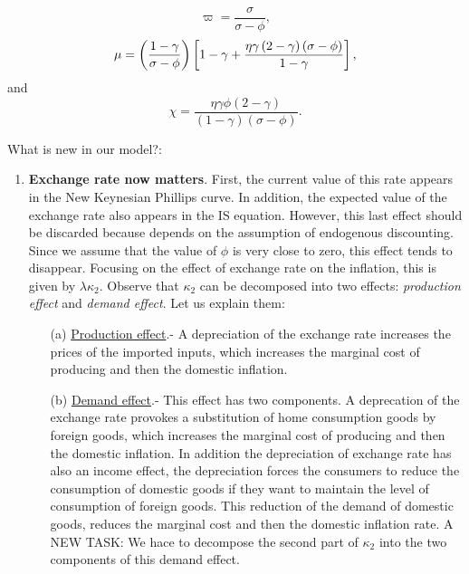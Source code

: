 \documentclass{article}
\begin{document}
\begin{equation*}
\varpi =\frac{\sigma }{\sigma -\phi },
\end{equation*}%
\begin{equation*}
\mu =\left( \frac{1-\gamma }{\sigma -\phi }\right) \left[ 1-\gamma +\frac{%
\eta \gamma \left( 2-\gamma \right) \left( \sigma -\phi \right) }{1-\gamma }%
\right] ,
\end{equation*}%
and%
\begin{equation*}
\chi =\frac{\eta \gamma \phi \left( 2-\gamma \right) }{\left( 1-\gamma
\right) \left( \sigma -\phi \right) }.
\end{equation*}

What is new in our model?:

\begin{enumerate}
\item \textbf{Exchange rate now matters}. First, the current value of this
rate appears in the New Keynesian Phillips curve. In addition, the expected
value of the exchange rate also appears in the IS equation. However, this
last effect should be discarded because depends on the assumption of
endogenous discounting. Since we assume that the value of $\phi $ is very
close to zero, this effect tends to disappear. Focusing on the effect of
exchange rate on the inflation, this is given by $\lambda \kappa _{2}.$
Observe that $\kappa _{2}$ can be decomposed into two effects: \textit{%
production effect} and \textit{demand effect}. Let us explain them:

\begin{itemize}
\item[(a)] \underline{Production effect}.- A depreciation of the exchange
rate increases the prices of the imported inputs, which increases the
marginal cost of producing and then the domestic inflation.

\item[(b)] \underline{Demand effect}.- This effect has two components. A
deprecation of the exchange rate provokes a substitution of home consumption
goods by foreign goods, which increases the marginal cost of producing and
then the domestic inflation. In addition the depreciation of exchange rate
has also an income effect, the depreciation forces the consumers to reduce
the consumption of domestic goods if they want to maintain the level of
consumption of foreign goods. This reduction of the demand of domestic
goods, reduces the marginal cost and then the domestic inflation rate. A NEW
TASK: We hace to decompose the second part of $\kappa _{2}$ into the two
components of this demand effect.
\end{itemize}


\end{enumerate}
\end{document}
